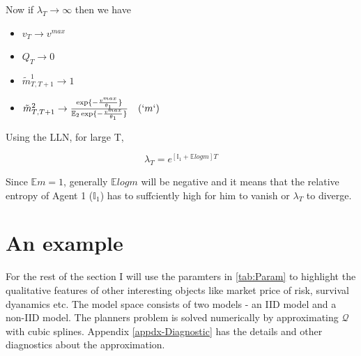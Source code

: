 \documentclass[12pt]{article}
\begin{document}
Now if $\lambda_{T}\to \infty$ then we have
\begin{itemize}
\item $v_{T}\to v^{max}$
\item $Q_{T}\to 0$
\item $\tilde{m}^1_{T,T+1} \to 1$
\item $\tilde{m}^2_{T,T+1} \to \frac{\exp \{-\frac{v^{max}}{\theta_1}\}}{\mathbb{E}_2 \exp\{-\frac{v^{max}}{\theta_1}\}} \quad (`m`)$
\end{itemize}
Using the LLN, for large T,

\[\lambda_T=e^{[\mathbb{I}_1 + \mathbb{E} log m]T} \]

Since $\mathbb{E}m=1$, generally $\mathbb{E} log m$ will be negative
and it means that the relative entropy of Agent 1 ($\mathbb{I}_1$) has to suffciently
high for him to vanish or $\lambda_T$ to diverge.

\section{An example}
For the rest of the section I will use the  paramters in \ref{tab:Param} to highlight the qualitative features of other interesting objects like market price of risk, survival dyanamics etc. The model space consists of two models  - an IID model and a non-IID model.  The planners problem is solved numerically by approximating $\mathcal{Q}$ with cubic splines. Appendix \ref{appdx-Diagnostic} has the details and other diagnostics about the approximation.
\end{document}
